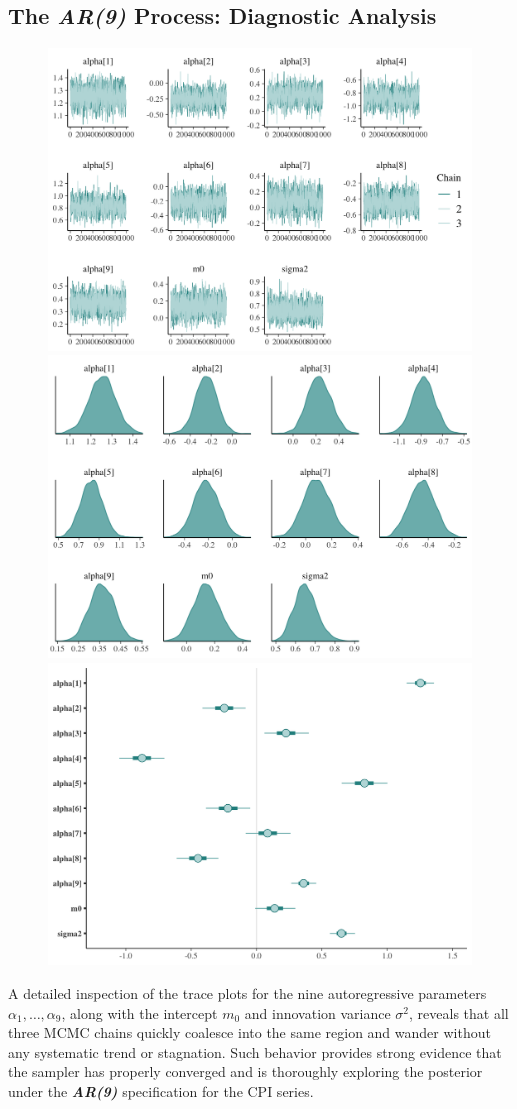 \documentclass{Configuration_Files/PoliMi3i_thesis}
\begin{document}
\subsection{The \textbf{\textit{AR(9)}} Process: Diagnostic Analysis}
\begin{figure}[H]
    \centering
    \includegraphics[width=0.57\linewidth]{AR(9)-trace.png}
    \vspace{0.5em}
    
    \includegraphics[width=0.57\linewidth]{AR(9)-density.png}
    \vspace{0.5em}
    
    \includegraphics[width=0.57\linewidth]{AR(9)-interval.png}
\end{figure}
\newpage
A detailed inspection of the trace plots for the nine autoregressive parameters \(\alpha_1,\dots,\alpha_9\), along with the intercept \(m_0\) and innovation variance \(\sigma^2\), reveals that all three MCMC chains quickly coalesce into the same region and wander without any systematic trend or stagnation. Such behavior provides strong evidence that the sampler has properly converged and is thoroughly exploring the posterior under the \textbf{\textit{AR(9)}} specification for the CPI series.
\end{document}
